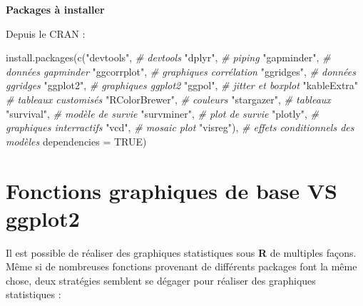 \documentclass[
]{book}
\newenvironment{Shaded}{\begin{snugshade}}{\end{snugshade}}
\newcommand{\AttributeTok}[1]{\textcolor[rgb]{0.77,0.63,0.00}{#1}}
\newcommand{\CommentTok}[1]{\textcolor[rgb]{0.56,0.35,0.01}{\textit{#1}}}
\newcommand{\ConstantTok}[1]{\textcolor[rgb]{0.00,0.00,0.00}{#1}}
\newcommand{\FunctionTok}[1]{\textcolor[rgb]{0.00,0.00,0.00}{#1}}
\newcommand{\NormalTok}[1]{#1}
\newcommand{\StringTok}[1]{\textcolor[rgb]{0.31,0.60,0.02}{#1}}
\theoremstyle{definition}
\theoremstyle{definition}
\theoremstyle{definition}
\theoremstyle{definition}
\theoremstyle{remark}
\begin{document}
\textbf{Packages à installer}

Depuis le CRAN :

\begin{Shaded}
\begin{Highlighting}[]
\FunctionTok{install.packages}\NormalTok{(}\FunctionTok{c}\NormalTok{(}\StringTok{"devtools"}\NormalTok{,      }\CommentTok{\# devtools}
                   \StringTok{"dplyr"}\NormalTok{,         }\CommentTok{\# piping}
                   \StringTok{"gapminder"}\NormalTok{,     }\CommentTok{\# données gapminder}
                   \StringTok{"ggcorrplot"}\NormalTok{,    }\CommentTok{\# graphiques corrélation}
                   \StringTok{"ggridges"}\NormalTok{,      }\CommentTok{\# données ggridges}
                   \StringTok{"ggplot2"}\NormalTok{,       }\CommentTok{\# graphiques ggplot2}
                   \StringTok{"ggpol"}\NormalTok{,         }\CommentTok{\# jitter et boxplot}
                   \StringTok{"kableExtra"}     \CommentTok{\# tableaux customisés }
                   \StringTok{"RColorBrewer"}\NormalTok{,  }\CommentTok{\# couleurs }
                   \StringTok{"stargazer"}\NormalTok{,     }\CommentTok{\# tableaux }
                   \StringTok{"survival"}\NormalTok{,      }\CommentTok{\# modèle de survie}
                   \StringTok{"survminer"}\NormalTok{,     }\CommentTok{\# plot de survie}
                   \StringTok{"plotly"}\NormalTok{,        }\CommentTok{\# graphiques interractifs }
                   \StringTok{"vcd"}\NormalTok{,           }\CommentTok{\# mosaic plot}
                   \StringTok{"visreg"}\NormalTok{),        }\CommentTok{\# effets conditionnels des modèles}
                 \AttributeTok{dependencies =} \ConstantTok{TRUE}\NormalTok{)}
\end{Highlighting}
\end{Shaded}

\hypertarget{fonctions-graphiques-de-base-vs-ggplot2}{%
\section{\texorpdfstring{Fonctions graphiques de base VS \textbf{ggplot2}}{Fonctions graphiques de base VS ggplot2}}\label{fonctions-graphiques-de-base-vs-ggplot2}}

Il est possible de réaliser des graphiques statistiques sous \textbf{R} de multiples façons. Même si de nombreuses fonctions provenant de différents packages font la même chose, deux stratégies semblent se dégager pour réaliser des graphiques statistiques :
\end{document}
